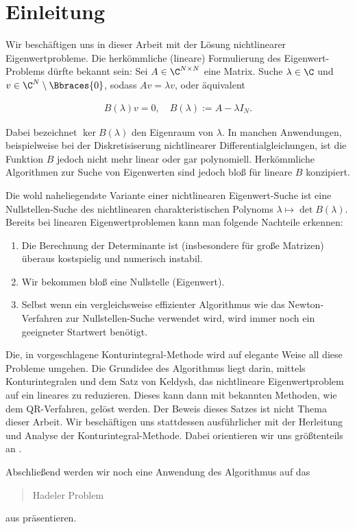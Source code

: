 \chapter{Einleitung}

Wir beschäftigen uns in dieser Arbeit mit der Lösung nichtlinearer Eigenwertprobleme.
Die herkömmliche (lineare) Formulierung des Eigenwert-Problems dürfte bekannt sein:
Sei $A \in \C^{N \times N}$ eine Matrix.
Suche $\lambda \in \C$ und $v \in \C^N \setminus \Bbraces{0}$, sodass $A v = \lambda v$, oder äquivalent

\begin{align} \label{eq:lineares_ewp}
    B(\lambda) v = 0,
    \quad
    B(\lambda) := A - \lambda I_N.
\end{align}

Dabei bezeichnet $\ker B(\lambda)$ den Eigenraum von $\lambda$.
In manchen Anwendungen, beispielweise bei der Diskretisiserung nichtlinearer Differentialgleichungen, ist die Funktion $B$ jedoch nicht mehr linear oder gar polynomiell.
Herkömmliche Algorithmen zur Suche von Eigenwerten sind jedoch bloß für lineare $B$ konzipiert.

Die wohl naheliegendste Variante einer nichtlinearen Eigenwert-Suche ist eine Nullstellen-Suche des nichtlinearen charakteristischen Polynoms $\lambda \mapsto \det B(\lambda)$.
Bereits bei linearen Eigenwertproblemen kann man folgende Nachteile erkennen:

\begin{enumerate}[label = \arabic*.]
    \item Die Berechnung der Determinante ist (insbesondere für große Matrizen) überaus kostspielig und numerisch instabil.
    \item Wir bekommen bloß eine Nullstelle (Eigenwert).
    \item Selbst wenn ein vergleichsweise effizienter Algorithmus wie das Newton-Verfahren zur Nullstellen-Suche verwendet wird, wird immer noch ein geeigneter Startwert benötigt.
\end{enumerate}

Die, in \cite{BEYN20123839} vorgeschlagene Konturintegral-Methode wird auf elegante Weise all diese Probleme umgehen.
Die Grundidee des Algorithmus liegt darin, mittels Konturintegralen und dem Satz von Keldysh, das nichtlineare Eigenwertproblem auf ein lineares zu reduzieren.
Dieses kann dann mit bekannten Methoden, wie dem QR-Verfahren, gelöst werden.
Der Beweis dieses Satzes ist nicht Thema dieser Arbeit.
Wir beschäftigen uns stattdessen ausführlicher mit der Herleitung und Analyse der Konturintegral-Methode.
Dabei orientieren wir uns größtenteils an \cite{EWPs}.

Abschließend werden wir noch eine Anwendung des Algorithmus auf das \blockquote{Hadeler Problem} aus \cite{saad2020rational} präsentieren.
